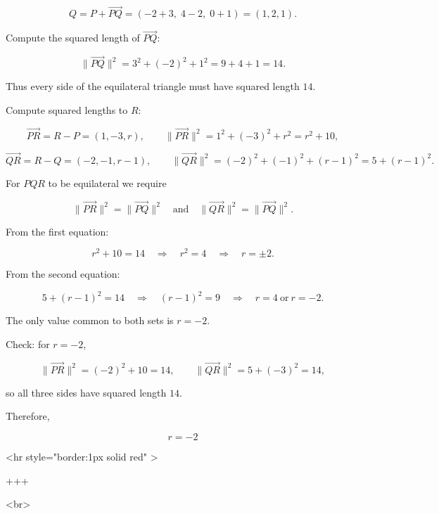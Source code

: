 $$
Q=P+\overrightarrow{PQ}=( -2+3,\;4-2,\;0+1)=(1,2,1).
$$


Compute the squared length of $\overrightarrow{PQ}$:

$$
\lVert\overrightarrow{PQ}\rVert^2=3^2+(-2)^2+1^2=9+4+1=14.
$$

Thus every side of the equilateral triangle must have squared length $14$.

Compute squared lengths to $R$:

$$
\overrightarrow{PR}=R-P=(1,-3,r),\qquad
\lVert\overrightarrow{PR}\rVert^2=1^2+(-3)^2+r^2=r^2+10,
$$


$$
\overrightarrow{QR}=R-Q=(-2,-1,r-1),\qquad
\lVert\overrightarrow{QR}\rVert^2=(-2)^2+(-1)^2+(r-1)^2=5+(r-1)^2.
$$

For $PQR$ to be equilateral we require

$$
\lVert\overrightarrow{PR}\rVert^2=\lVert\overrightarrow{PQ}\rVert^2
\quad\text{and}\quad
\lVert\overrightarrow{QR}\rVert^2=\lVert\overrightarrow{PQ}\rVert^2.
$$

From the first equation:

$$
r^2+10=14 \quad\Longrightarrow\quad r^2=4 \quad\Longrightarrow\quad r=\pm 2.
$$

From the second equation:

$$
5+(r-1)^2=14 \quad\Longrightarrow\quad (r-1)^2=9 \quad\Longrightarrow\quad r=4\ \text{or}\ r=-2.
$$

The only value common to both sets is $r=-2$.

Check: for $r=-2$,

$$
\lVert\overrightarrow{PR}\rVert^2 = (-2)^2+10=14,\qquad
\lVert\overrightarrow{QR}\rVert^2 = 5+(-3)^2=14,
$$

so all three sides have squared length $14$.

Therefore,

$$
r=-2
$$

<hr style="border:1px solid red" >

+++

<br>

